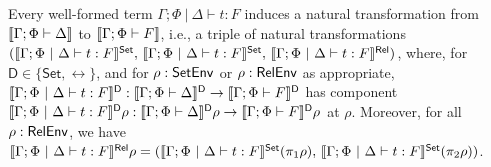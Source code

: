 \documentclass[runningheads]{llncs}
\newcommand{\set}{\mathsf{Set}}
\begin{document}
\begin{theorem}\label{thm:at-gen}
Every well-formed term $\Gamma;\Phi~|~\Delta \vdash t : F$ induces a
natural transformation from $\llbracket{\Gamma; \Phi \vdash \Delta}\rrbracket$ to
$\llbracket{\Gamma; \Phi \vdash F}\rrbracket$, i.e., a triple of natural
transformations $(\setsem{\Gamma;\Phi~|~\Delta \vdash t : F},\,
\setsem{\Gamma;\Phi~|~\Delta \vdash t : F},\,
\relsem{\Gamma;\Phi~|~\Delta \vdash t : F})$, where, for $\mathsf D
\in \{\set,\rel\}$, and for $\rho : \mathsf{SetEnv}$ or $\rho : \mathsf{RelEnv}$ as
appropriate, $\llbracket{\Gamma;\Phi~|~\Delta \vdash t : F}\rrbracket^{\mathsf D} :
\llbracket{\Gamma; \Phi \vdash \Delta}\rrbracket^{\mathsf D} \to \llbracket{\Gamma; \Phi
  \vdash F}\rrbracket^{\mathsf D}$ has component $\llbracket{\Gamma;\Phi~|~\Delta
  \vdash t : F}\rrbracket^{\mathsf D}\rho : \llbracket{\Gamma; \Phi \vdash
  \Delta}\rrbracket^{\mathsf D}\rho \to \llbracket{\Gamma; \Phi \vdash F}\rrbracket^{\mathsf
  D}\rho$ at $\rho$. Moreover, for all $\rho : \mathsf{RelEnv}$, we have
$\relsem{\Gamma;\Phi~|~\Delta \vdash t : F}\rho =
(\setsem{\Gamma;\Phi~|~\Delta \vdash t : F}(\pi_1 \rho),\,
\setsem{\Gamma;\Phi~|~\Delta \vdash t : F}(\pi_2 \rho))$.

\vspace*{-0.05in}

\begin{comment}
\[\begin{array}{lll}
\setsem{\Gamma;\Phi~|~\Delta \vdash t : F} & : & \setsem{\Gamma;
  \Phi \vdash \Delta} \to \setsem{\Gamma; \Phi \vdash F}
\end{array}\]
has as its component at $\rho : \setenv$ a morphism
\[\begin{array}{lll}
\setsem{\Gamma;\Phi~|~\Delta \vdash t : F}\rho & : & \setsem{\Gamma;
  \Phi \vdash \Delta}\rho \to \setsem{\Gamma; \Phi \vdash F}\rho
\end{array}\]
in $\set$,
\[\begin{array}{lll}
\relsem{\Gamma;\Phi~|~\Delta \vdash t : F} & : & \relsem{\Gamma;
  \Phi \vdash \Delta} \to \relsem{\Gamma; \Phi \vdash F}
\end{array}\]
has as its component at $\rho : \relenv$ a morphism
\[\begin{array}{lll}
\relsem{\Gamma;\Phi~|~\Delta \vdash t : F}\rho & : & \relsem{\Gamma;
  \Phi \vdash \Delta}\rho \to \relsem{\Gamma; \Phi \vdash F}\rho
\end{array}\]
in $\rel$, and for all $\rho : \relenv$,
\begin{equation}\label{eq:projs}
\relsem{\Gamma;\Phi~|~\Delta \vdash t : F}\rho =
(\setsem{\Gamma;\Phi~|~\Delta \vdash t : F}(\pi_1 \rho),\,
\setsem{\Gamma;\Phi~|~\Delta \vdash t : F}(\pi_2 \rho))
\end{equation}
\end{comment}
\end{theorem}
\end{document}
